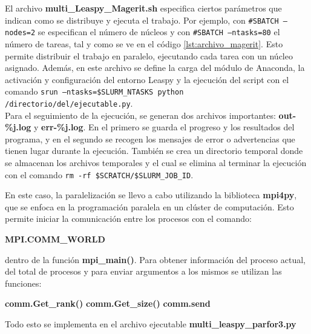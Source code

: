El archivo \textbf{multi\_Leaspy\_Magerit.sh} especifica ciertos parámetros que indican como se distribuye y ejecuta el trabajo. Por ejemplo, con \texttt{\#SBATCH --nodes=2} se especifican el número de núcleos y con \texttt{\#SBATCH --ntasks=80} el número de tareas, tal y como se ve en el código \ref{lst:archivo_magerit}. Esto permite distribuir el trabajo en paralelo, ejecutando cada tarea con un núcleo asignado. Además, en este archivo se define la carga del módulo de Anaconda, la activación y configuración del entorno Leaspy y la ejecución del script con el comando \texttt{srun --ntasks=\$SLURM\_NTASKS python /directorio/del/ejecutable.py}.\\



Para el seguimiento de la ejecución, se generan dos archivos importantes: \textbf{out-\%j.log} y \textbf{err-\%j.log}. En el primero se guarda el progreso y los resultados del programa, y en el segundo se recogen los mensajes de error o advertencias que tienen lugar durante la ejecución. También se crea un directorio temporal donde se almacenan los archivos temporales y el cual se elimina al terminar la ejecución con el comando \texttt{rm -rf \$SCRATCH/\$SLURM\_JOB\_ID}.

En este caso, la paralelización se llevo a cabo utilizando la biblioteca \textbf{mpi4py}, que se enfoca en la programación paralela en un clúster de computación. Esto permite iniciar la comunicación entre los procesos con el comando:
\begin{center}
	\textbf{MPI.COMM\_WORLD}
\end{center}
dentro de la función \textbf{mpi\_main()}.  Para obtener información del proceso actual, del total de procesos y para enviar argumentos a los mismos se utilizan las funciones:
\begin{center}
	\textbf{comm.Get\_rank()}
	\textbf{comm.Get\_size()}
	\textbf{comm.send}
\end{center}

Todo esto se implementa en el archivo ejecutable \textbf{multi\_leaspy\_parfor3.py}\\


